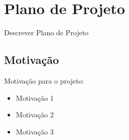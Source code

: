 \section{Plano de Projeto}

Descrever Plano de Projeto

\subsection{Motivação}

Motivação para o projeto:

\begin{itemize}
\item Motivação 1
\item Motivação 2
\item Motivação 3
\end{itemize}
